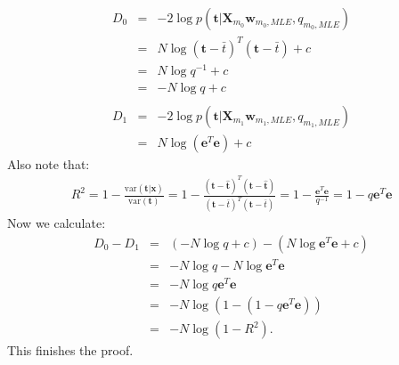 \documentclass[a4paper, 11pt]{article}
\begin{document}
\begin{eqnarray}
D_0 &=& -2 \log p(\mathbf{t} | \mathbf{X}_{m_0} \mathbf{w}_{m_0, MLE}, q_{m_0, MLE})  \nonumber \\
&=& N \log (\mathbf{t} - \bar{t})^T (\mathbf{t} - \bar{t}) + c \nonumber \\
&=& N \log q^{-1} + c \nonumber \\
&=& - N \log q + c \nonumber \\
\nonumber \\
D_1 &=& -2 \log p(\mathbf{t} | \mathbf{X}_{m_1} \mathbf{w}_{m_1, MLE}, q_{m_1, MLE})  \nonumber \\
&=& N \log (\mathbf{e}^T \mathbf{e}) + c \nonumber
\end{eqnarray}
Also note that:
\begin{eqnarray}
R^2 = 1 - \frac{\text{var}(\mathbf{t} | \mathbf{x}) }{\text{var}(\mathbf{t})} = 1 - \frac{(\mathbf{t} - \hat{\mathbf{t}})^T (\mathbf{t} - \hat{\mathbf{t}})}{(\mathbf{t} - \bar{t})^T (\mathbf{t} - \bar{t})} = 1 - \frac{\mathbf{e}^T \mathbf{e}}{q^{-1}} = 1 - q \mathbf{e}^T \mathbf{e}  \nonumber
\end{eqnarray}
Now we calculate:
\begin{eqnarray}
D_0 - D_1 &=& (-N \log q + c) - (N \log \mathbf{e}^T \mathbf{e} + c) \nonumber \\
&=& -N \log q - N \log \mathbf{e}^T \mathbf{e} \nonumber \\ 
&=& -N  \log q \mathbf{e}^T \mathbf{e} \nonumber \\ 
&=& -N  \log \left(1 - (1 - q \mathbf{e}^T \mathbf{e})\right) \nonumber \\ 
&=& -N  \log \left(1 - R^2 \right). \nonumber
\end{eqnarray}
This finishes the proof.
\end{document}
